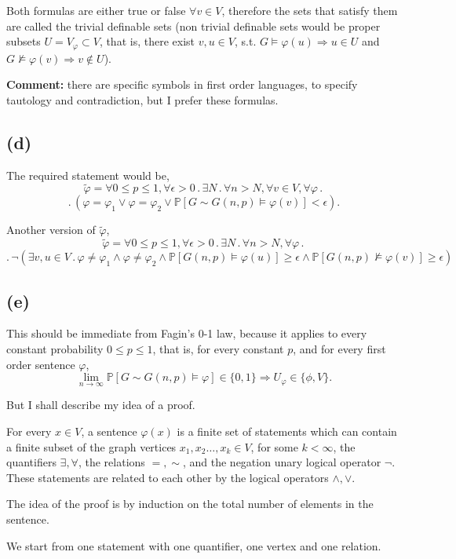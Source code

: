 \documentclass{article}
\begin{document}
Both formulas are either true or false $\forall{v}\in{V}$, therefore the sets that satisfy them are called the trivial definable sets (non trivial definable sets would be proper subsets $U=V_\varphi\subset{V}$, that is, there exist $v,u\in{V}$, s.t. $G\vDash\varphi(u)\Rightarrow{u}\in{U}$ and $G\nvDash\varphi(v)\Rightarrow{v}\notin{U}$).

\textbf{Comment:} there are specific symbols in first order languages, to specify tautology and contradiction, but I prefer these formulas.
\subsection*{(d)}
The required statement would be,
\noindent
\[\tilde\varphi=\forall{0\leq{p}\leq{1}},\forall\epsilon>0\,.\,\exists{N}\,.\,\forall{n>N},\forall{v}\in{V},\forall\varphi\,.\,\]\[.\,(\varphi=\varphi_1\lor\varphi=\varphi_2\lor\mathbb{P}[G\sim{G(n,p)}\vDash\varphi(v)]<\epsilon).\]

Another version of $\tilde\varphi$,
\noindent
\[\tilde\varphi=\forall{0\leq{p}\leq{1}},\forall\epsilon>0\,.\,\exists{N}\,.\,\forall{n>N},\forall\varphi\,.\,\]\[.\,\neg(\exists{v,u\in{V}}\,.\,\varphi\neq\varphi_1\land\varphi\neq\varphi_2\land\mathbb{P}[G(n,p)\vDash\varphi(u)]\geq\epsilon\land\mathbb{P}[G(n,p)\nvDash\varphi(v)]\geq\epsilon)\]
\subsection*{(e)}
This should be immediate from Fagin's 0-1 law, because it applies to every constant probability $0\leq{p}\leq{1}$, that is, for every constant $p$, and for every first order sentence $\varphi$,
\[
\lim_{n\rightarrow\infty}\mathbb{P}[G\sim{G(n,p)}\vDash\varphi]\in\{0,1\}\Rightarrow{U_\varphi\in\{\phi,V\}}.
\]

But I shall describe my idea of a proof.

For every $x\in{V}$, a sentence $\varphi(x)$ is a finite set of statements which can contain a finite subset of the graph vertices $x_1,x_2\dots,x_k\in{V}$, for some $k<\infty$, the quantifiers $\exists,\forall$, the relations $=,\sim$, and the negation unary logical operator $\neg$. These statements are related to each other by the logical operators $\land,\lor$.

The idea of the proof is by induction on the total number of elements in the sentence.

We start from one statement with one quantifier, one vertex and one relation.
\end{document}

